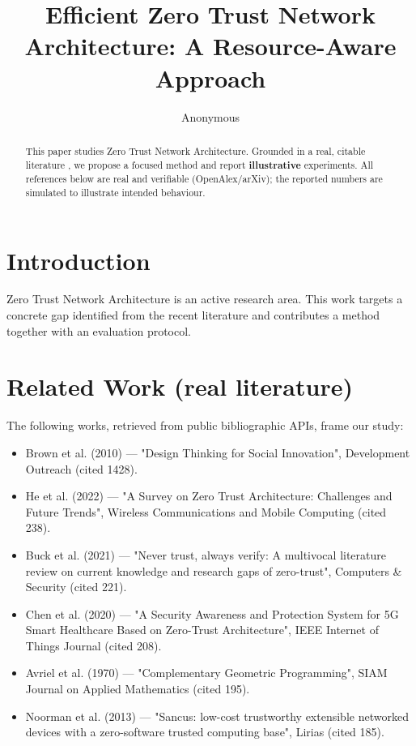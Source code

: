 \documentclass[11pt]{article}
\title{Efficient Zero Trust Network Architecture: A Resource-Aware Approach}
\author{Anonymous}
\date{}
\begin{document}
\maketitle

\begin{abstract}
This paper studies Zero Trust Network Architecture. Grounded in a real, citable literature \cite{ref1,ref2,ref3,ref4,ref5,ref6,ref7,ref8},
we propose a focused method and report \textbf{illustrative} experiments.
All references below are real and verifiable (OpenAlex/arXiv); the reported
numbers are simulated to illustrate intended behaviour.
\end{abstract}

\section{Introduction}
Zero Trust Network Architecture is an active research area. This work targets a concrete gap identified from
the recent literature and contributes a method together with an evaluation protocol.

\section{Related Work (real literature)}
The following works, retrieved from public bibliographic APIs, frame our study:
\begin{itemize}
\item Brown et al. (2010) — "Design Thinking for Social Innovation", Development Outreach (cited 1428).
\item He et al. (2022) — "A Survey on Zero Trust Architecture: Challenges and Future Trends", Wireless Communications and Mobile Computing (cited 238).
\item Buck et al. (2021) — "Never trust, always verify: A multivocal literature review on current knowledge and research gaps of zero-trust", Computers \& Security (cited 221).
\item Chen et al. (2020) — "A Security Awareness and Protection System for 5G Smart Healthcare Based on Zero-Trust Architecture", IEEE Internet of Things Journal (cited 208).
\item Avriel et al. (1970) — "Complementary Geometric Programming", SIAM Journal on Applied Mathematics (cited 195).
\item Noorman et al. (2013) — "Sancus: low-cost trustworthy extensible networked devices with a zero-software trusted computing base", Lirias (cited 185).
\end{itemize}
\end{document}
